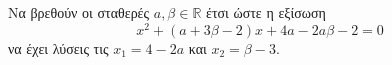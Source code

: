 Να βρεθούν οι σταθερές $ a, \beta\in\mathbb{R} $ έτσι ώστε η εξίσωση
 \[ x^2+(a+3\beta-2)x+4a-2a\beta-2=0 \]
να έχει λύσεις τις $ x_1=4-2a $ και $ x_2=\beta-3 $.
